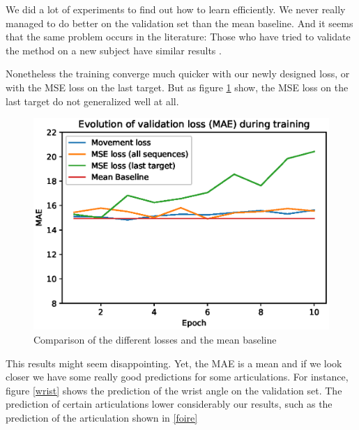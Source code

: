 \documentclass[final]{cvpr}
\begin{document}
We did a lot of experiments to find out how to learn efficiently. We never really managed to do better on the validation set than the mean baseline. And it seems that the same problem occurs in the literature: Those who have tried to validate the method on a new subject have similar results \cite{Kir}.

Nonetheless the training converge much quicker with our newly designed loss, or with the MSE loss on the last target. But as figure \ref{fig:loss} show, the MSE loss on the last target do not generalized well at all.

\begin{figure}[t]
	\begin{center}
		\includegraphics[width=0.95\linewidth]{training_evolution.eps}
	\end{center}
	\caption{Comparison of the different losses and the mean baseline}
	\label{fig:loss}
\end{figure}

This results might seem disappointing. Yet, the MAE is a mean and if we look closer we have some really good predictions for some articulations. For instance, figure \ref{wrist} shows the prediction of the wrist angle on the validation set. The prediction of certain articulations lower considerably our results, such as the prediction of the articulation shown in \ref{foire}
\end{document}
